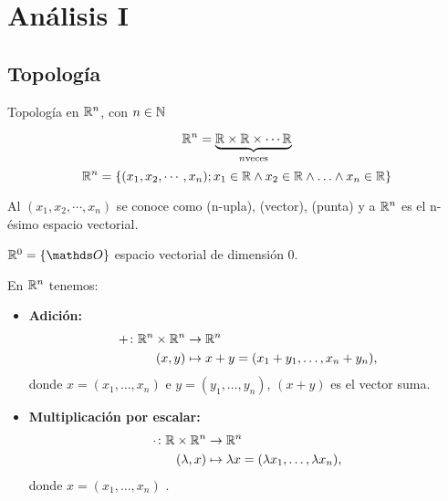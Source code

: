 \chapter{Análisis I}

\section{Topología}

Topología en $\mathbb{R}^{n}$, con $n \in \mathbb{N}$

$$
\mathbb{R}^{n} =  \underbrace{\mathbb{R} \times \mathbb{R} \times \cdots \mathbb{R} }_{n \text{veces}}
$$
$$
\mathbb{R}^{n} = \{ (x_1, x_2, \cdots, x_n); x_1 \in \mathbb{R} \wedge  x_2 \in \mathbb{R} \wedge
 \ldots  \wedge  x_n \in \mathbb{R}       \}
$$

Al $(x_1, x_2, \cdots, x_n) $  se conoce como (n-upla), (vector), (punta) y a $\mathbb{R}^{n}$ es el n-ésimo espacio vectorial.

$\Real{0} = \{\Ou\}$  espacio vectorial de dimensión $0$.

En $\mathbb{R}^{n}$ tenemos:

\begin{itemize}
    \item \textbf{Adición:}
    \begin{align*}
        +\colon \mathbb{R}^{n} \times \mathbb{R}^{n} &\to \mathbb{R}^{n} \\
        (x, y) &\mapsto x + y = (x_1 + y_1, \dots, x_n + y_n),
    \end{align*}
    donde $x = (x_1, \dots, x_n)$ e $y = (y_1, \dots, y_n)$, $(x+y)$ es el vector suma.

    \item \textbf{Multiplicación por escalar:}
    \begin{align*}
        \cdot\colon \mathbb{R} \times \mathbb{R}^{n} &\to \mathbb{R}^{n} \\
        (\lambda, x) &\mapsto \lambda x = (\lambda x_1, \dots, \lambda x_n),
    \end{align*}
    donde $x = (x_1, \dots, x_n)$ .
\end{itemize}




